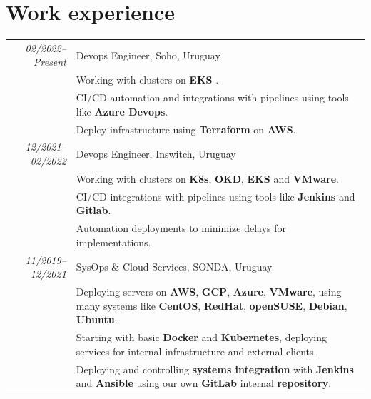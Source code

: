 \documentclass[a4paper,14pt]{article}
\begin{document}
\section{Work experience}
\begin{tabular}{r|p{12cm}}
\emph{02/2022–Present} & Devops Engineer, Soho, Uruguay \\
\textsc{}&\footnotesize{Working with clusters on \textbf{EKS} .}\\
\textsc{}&\footnotesize{CI/CD automation and integrations with pipelines using tools like \textbf{Azure Devops}.}\\
\textsc{}&\footnotesize{Deploy infrastructure using \textbf{Terraform} on \textbf{AWS}.}\\

\emph{12/2021–02/2022} & Devops Engineer, Inswitch, Uruguay \\
\textsc{}&\footnotesize{Working with clusters on \textbf{K8s}, \textbf{OKD}, \textbf{EKS} and \textbf{VMware}.}\\
\textsc{}&\footnotesize{CI/CD integrations with pipelines using tools like \textbf{Jenkins} and \textbf{Gitlab}.}\\
\textsc{}&\footnotesize{Automation deployments to minimize delays for implementations.}\\

\emph{11/2019–12/2021} & SysOps \& Cloud Services, 
SONDA, Uruguay \\
\textsc{}&\footnotesize{Deploying servers on \textbf{AWS}, \textbf{GCP}, \textbf{Azure}, \textbf{VMware}, using many systems like \textbf{CentOS}, \textbf{RedHat}, \textbf{openSUSE}, \textbf{Debian}, \textbf{Ubuntu}.}\\&
\footnotesize{Starting with basic \textbf{Docker} and \textbf{Kubernetes}, deploying services for internal infrastructure and external clients.}\\&
\footnotesize{Deploying and controlling \textbf{systems integration} with \textbf{Jenkins} and \textbf{Ansible} using our own \textbf{GitLab} internal \textbf{repository}.}\\


\end{tabular}
\end{document}
